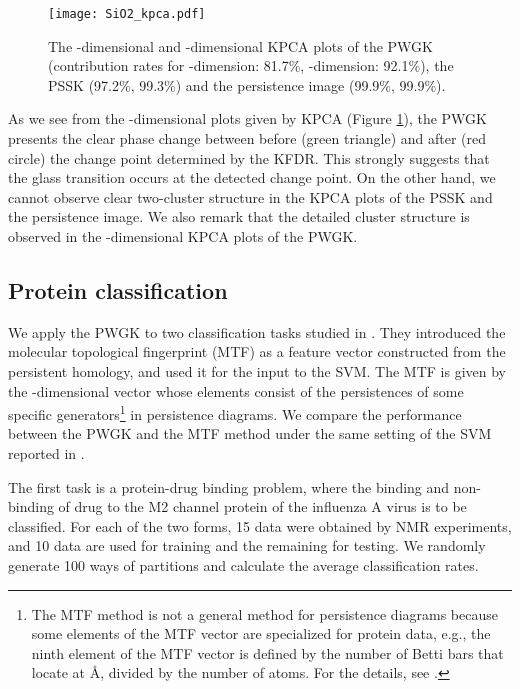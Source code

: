 \documentclass{article}
\begin{document}
\begin{figure}[htbp]
\begin{center}
\texttt{[image: SiO2\_kpca.pdf]}
\end{center}
\vspace{-3mm}
\caption{The -dimensional and -dimensional KPCA plots of the PWGK (contribution rates for -dimension: 81.7\%, -dimension: 92.1\%), the PSSK (97.2\%, 99.3\%) and the persistence image (99.9\%, 99.9\%).}
\label{fig:glass_kpca}
\end{figure}
As we see from the -dimensional plots given by KPCA (Figure \ref{fig:glass_kpca}), the PWGK presents the clear phase change between before (green triangle) and after (red circle) the change point determined by the KFDR.
This strongly suggests that the glass transition occurs at the detected change point.
On the other hand, we cannot observe clear two-cluster structure in the KPCA plots of the PSSK and the persistence image.  
We also remark that the detailed cluster structure is observed in the -dimensional KPCA plots of the PWGK.

\subsection{Protein classification}
\label{subsec:Protein}

We apply the PWGK to two classification tasks studied in \cite{CMWOXW15}.
They introduced the molecular topological fingerprint (MTF) as a feature vector constructed from the persistent homology, and used it for the input to the SVM.
The MTF is given by the -dimensional vector whose elements consist of the persistences of some specific generators\footnote{The MTF method is not a general method for persistence diagrams because some elements of the MTF vector are specialized for protein data, e.g., the ninth element of the MTF vector is defined by the number of Betti  bars that locate at \AA, divided by the number of atoms. For the details, see \cite{CMWOXW15}.} in persistence diagrams.
We compare the performance between the PWGK and the MTF method under the same setting of the SVM reported in \cite{CMWOXW15}.

The first task is a protein-drug binding problem, where the binding and non-binding of drug to the M2 channel protein of the influenza A virus is to be classified.
For each of the two forms, 15 data were obtained by NMR experiments, and 10 data are used for training and the remaining for testing.
We randomly generate 100 ways of partitions and calculate the average classification rates.
\end{document}
